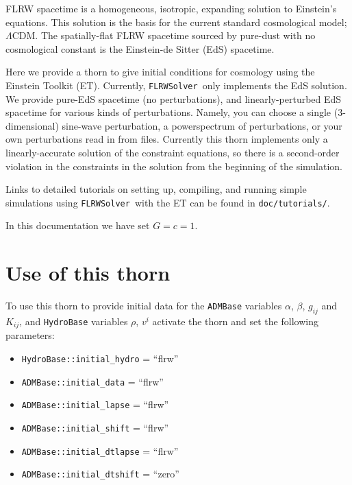 FLRW spacetime is a homogeneous, isotropic, expanding solution to Einstein's equations. This solution is the basis for the current standard cosmological model; $\Lambda$CDM.
The spatially-flat FLRW spacetime sourced by pure-dust with no cosmological constant is the Einstein-de Sitter (EdS) spacetime. 

Here we provide a thorn to give initial conditions for cosmology using the Einstein Toolkit (ET). Currently, \texttt{FLRWSolver}\ only implements the EdS solution. We provide pure-EdS spacetime (no perturbations), and linearly-perturbed EdS spacetime for various kinds of perturbations. Namely, you can choose a single (3-dimensional) sine-wave perturbation, a powerspectrum of perturbations, or your own perturbations read in from files. 
Currently this thorn implements only a linearly-accurate solution of the constraint equations, so there is a second-order violation in the constraints in the solution from the beginning of the simulation. %

Links to detailed tutorials on setting up, compiling, and running simple simulations using \texttt{FLRWSolver}\ with the ET can be found in \texttt{doc/tutorials/}.

In this documentation we have set $G=c=1$.

\section{Use of this thorn}

To use this thorn to provide initial data for the {\tt ADMBase} variables $\alpha$, $\beta$, $g_{ij}$ and $K_{ij}$, and {\tt HydroBase} variables $\rho$, $v^i$ activate the thorn and set the following parameters: 
\begin{itemize}
	\item \texttt{HydroBase::initial\_hydro} = ``flrw''
	\item \texttt{ADMBase::initial\_data} = ``flrw''
	\item \texttt{ADMBase::initial\_lapse} = ``flrw''
	\item \texttt{ADMBase::initial\_shift} = ``flrw''
	\item \texttt{ADMBase::initial\_dtlapse} = ``flrw''
	\item \texttt{ADMBase::initial\_dtshift} = ``zero''
\end{itemize}

